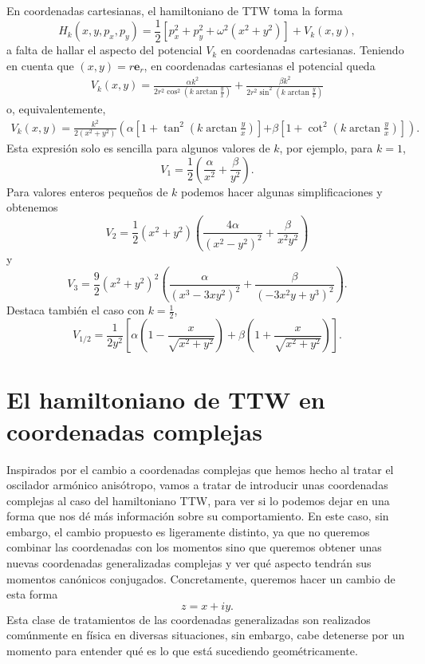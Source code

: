 \documentclass[12pt,a4paper,twoside]{article}
\theoremstyle{definition} \newtheorem{defn}[thm]{Definición}
\theoremstyle{definition} \newtheorem{ejemplo}[thm]{Ejemplo}
\theoremstyle{definition} \newtheorem{ejercicio}[thm]{Ejercicio}
\theoremstyle{remark} \newtheorem*{obs}{Observación}
\newcommand{\vect}[1]{\mathbf{#1}}
\begin{document}
En coordenadas cartesianas, el hamiltoniano de TTW toma la forma
\begin{equation}
  H_k(x,y,p_x,p_y)=\frac{1}{2}[p_x^2+p_y^2+\omega^2(x^2+y^2)]+V_k(x,y),
\end{equation}
a falta de hallar el aspecto del potencial $V_k$ en coordenadas cartesianas.
Teniendo en cuenta que $(x,y)=r\vect{e}_r$, en coordenadas cartesianas el potencial queda
\begin{align}
  V_k(x,y)=\frac{\alpha k^2}{2r^2\cos^2(k\arctan \tfrac{y}{x})} +\frac{\beta k^2}{2r^2\sin^2(k\arctan \tfrac{y}{x})}
\end{align}
o, equivalentemente,
\begin{align}
  V_k(x,y)=\frac{k^2}{2(x^2+y^2)}\left( \alpha\left[ 1+\tan^2\left( k\arctan\frac{y}{x} \right) \right] \right. \left. +\beta\left[ 1+\cot^2\left( k\arctan\frac{y}{x} \right) \right]\right).
\end{align}
Esta expresión solo es sencilla para algunos valores de $k$, por ejemplo, para $k=1$,
\begin{equation}
  V_1=\frac{1}{2}\left( \frac{\alpha}{x^2}+\frac{\beta}{y^2} \right).
\end{equation}
Para valores enteros pequeños de $k$ podemos hacer algunas simplificaciones y obtenemos
\begin{equation}
  V_2=\frac{1}{2}(x^2+y^2)\left( \frac{4\alpha}{(x^2-y^2)^2}+\frac{\beta}{x^2y^2} \right)
\end{equation}
y
\begin{equation}
  V_3=\frac{9}{2}(x^2+y^2)^2\left( \frac{\alpha}{(x^3-3xy^2)^2}+\frac{\beta}{(-3x^2y+y^3)^2} \right).
\end{equation}
Destaca también el caso con $k=\tfrac{1}{2}$,
\begin{equation}
  V_{1/2}=\frac{1}{2y^2}\left[ \alpha\left( 1-\frac{x}{\sqrt{x^2+y^2}} \right)+ \beta\left( 1+\frac{x}{\sqrt{x^2+y^2}} \right) \right].
\end{equation}

\section{El hamiltoniano de TTW en coordenadas complejas}
Inspirados por el cambio a coordenadas complejas que hemos hecho al tratar el oscilador armónico anisótropo, vamos a tratar de introducir unas coordenadas complejas al caso del hamiltoniano TTW, para ver si lo podemos dejar en una forma que nos dé más información sobre su comportamiento. En este caso, sin embargo, el cambio propuesto es ligeramente distinto, ya que no queremos combinar las coordenadas con los momentos sino que queremos obtener unas nuevas coordenadas generalizadas complejas y ver qué aspecto tendrán sus momentos canónicos conjugados. Concretamente, queremos hacer un cambio de esta forma
\begin{equation}
  z=x+iy.
\end{equation}
Esta clase de tratamientos de las coordenadas generalizadas son realizados comúnmente en física en diversas situaciones, sin embargo, cabe detenerse por un momento para entender qué es lo que está sucediendo geométricamente.
\end{document}
